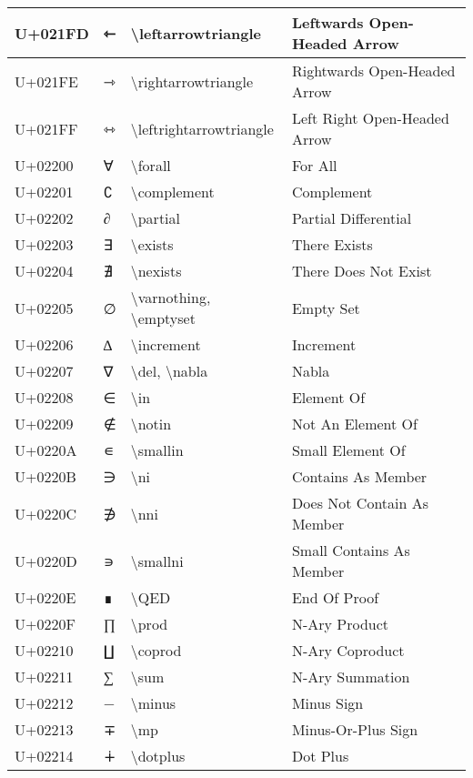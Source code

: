 \begin{table}[h]
\begin{tabulary}{\linewidth}{|L|L|L|L|}
\hline
U+021FD & ⇽ & {\textbackslash}leftarrowtriangle & Leftwards Open-Headed Arrow \\
\hline
U+021FE & ⇾ & {\textbackslash}rightarrowtriangle & Rightwards Open-Headed Arrow \\
\hline
U+021FF & ⇿ & {\textbackslash}leftrightarrowtriangle & Left Right Open-Headed Arrow \\
\hline
U+02200 & ∀ & {\textbackslash}forall & For All \\
\hline
U+02201 & ∁ & {\textbackslash}complement & Complement \\
\hline
U+02202 & ∂ & {\textbackslash}partial & Partial Differential \\
\hline
U+02203 & ∃ & {\textbackslash}exists & There Exists \\
\hline
U+02204 & ∄ & {\textbackslash}nexists & There Does Not Exist \\
\hline
U+02205 & ∅ & {\textbackslash}varnothing, {\textbackslash}emptyset & Empty Set \\
\hline
U+02206 & ∆ & {\textbackslash}increment & Increment \\
\hline
U+02207 & ∇ & {\textbackslash}del, {\textbackslash}nabla & Nabla \\
\hline
U+02208 & ∈ & {\textbackslash}in & Element Of \\
\hline
U+02209 & ∉ & {\textbackslash}notin & Not An Element Of \\
\hline
U+0220A & ∊ & {\textbackslash}smallin & Small Element Of \\
\hline
U+0220B & ∋ & {\textbackslash}ni & Contains As Member \\
\hline
U+0220C & ∌ & {\textbackslash}nni & Does Not Contain As Member \\
\hline
U+0220D & ∍ & {\textbackslash}smallni & Small Contains As Member \\
\hline
U+0220E & ∎ & {\textbackslash}QED & End Of Proof \\
\hline
U+0220F & ∏ & {\textbackslash}prod & N-Ary Product \\
\hline
U+02210 & ∐ & {\textbackslash}coprod & N-Ary Coproduct \\
\hline
U+02211 & ∑ & {\textbackslash}sum & N-Ary Summation \\
\hline
U+02212 & − & {\textbackslash}minus & Minus Sign \\
\hline
U+02213 & ∓ & {\textbackslash}mp & Minus-Or-Plus Sign \\
\hline
U+02214 & ∔ & {\textbackslash}dotplus & Dot Plus \\

\end{tabulary}
\end{table}
